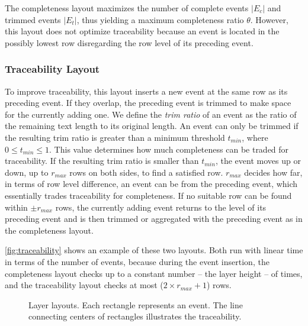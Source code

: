 The completeness layout maximizes the number of complete events $|E_c|$ and trimmed events $|E_t|$, thus yielding a maximum completeness ratio $\theta$. However, this layout does not optimize traceability because an event is located in the possibly lowest row disregarding the row level of its preceding event.

\subsubsection{Traceability Layout}
To improve traceability, this layout inserts a new event at the same row as its preceding event. If they overlap, the preceding event is trimmed to make space for the currently adding one. We define the \emph{trim ratio} of an event as the ratio of the remaining text length to its original length. An event can only be trimmed if the resulting trim ratio is greater than a minimum threshold $t_{min}$, where $0\leq t_{min} \leq 1$. This value determines how much completeness can be traded for traceability. If the resulting trim ratio is smaller than $t_{min}$, the event moves up or down, up to $r_{max}$ rows on both sides, to find a satisfied row. $r_{max}$ decides how far, in terms of row level difference, an event can be from the preceding event, which essentially trades traceability for completeness. If no suitable row can be found within $\pm r_{max}$ rows, the currently adding event returns to the level of its preceding event and is then trimmed or aggregated with the preceding event as in the completeness layout.

\autoref{fig:traceability} shows an example of these two layouts. Both  run with linear time in terms of the number of events, because during the event insertion, the completeness layout checks up to a constant number -- the layer height -- of times, and the traceability layout checks at most ($2 \times r_{max}+1$) rows.

\begin{figure}[!htb]
\centering
	\hfill
\caption[Layer layouts]{Layer layouts. Each rectangle represents an event. The line connecting centers of rectangles illustrates the  traceability.}
\label{fig:traceability}
\end{figure}

